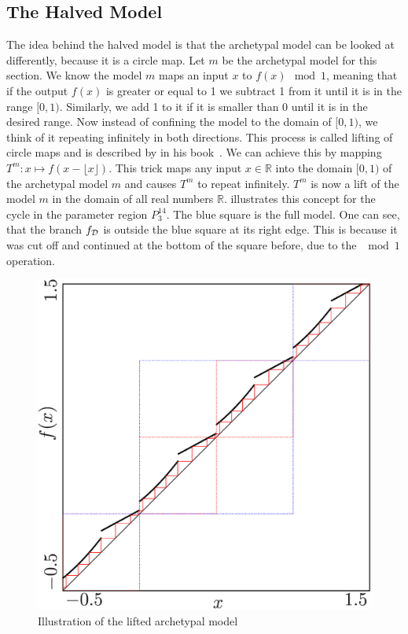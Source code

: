 \subsection{The Halved Model}
\label{sec:add.add.halved}

The idea behind the halved model is that the archetypal model can be looked at differently, because it is a circle map.
Let $m$ be the archetypal model for this section.
We know the model $m$ maps an input $x$ to $f(x) \mod 1$, meaning that if the output $f(x)$ is greater or equal to 1 we subtract 1 from it until it is in the range $[0, 1)$.
Similarly, we add 1 to it if it is smaller than 0 until it is in the desired range.
Now instead of confining the model to the domain of $[0, 1)$, we think of it repeating infinitely in both directions.
This process is called lifting of circle maps and is described by  in his book~\cite{devaney2021introduction}.
We can achieve this by mapping $T^m: x \mapsto f(x - \lfloor x \rfloor)$.
This trick maps any input $x \in \mathbb{R}$ into the domain $[0, 1)$ of the archetypal model $m$ and causes $T^m$ to repeat infinitely.
$T^m$ is now a lift of the model $m$ in the domain of all real numbers $\mathbb{R}$.
 illustrates this concept for the cycle in the parameter region $P^{14}_3$.
The blue square is the full model.
One can see, that the branch $f_{\mathcal{D}}$ is outside the blue square at its right edge.
This is because it was cut off and continued at the bottom of the square before, due to the $\mod 1$ operation.

\begin{figure}
	\centering
	\includegraphics[width=.7 \textwidth]{../Figures/7/7.18/result.png}
	\caption{Illustration of the lifted archetypal model}
	\label{fig:add.halved.lift}
\end{figure}

